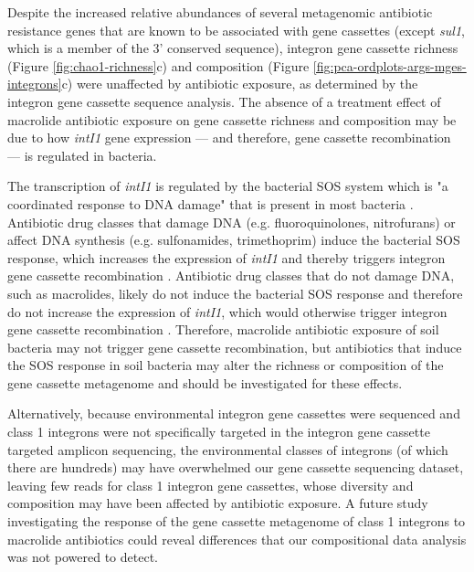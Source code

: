 Despite the increased relative abundances of several metagenomic antibiotic resistance genes that are known to be associated with gene cassettes (except \textit{sul1}, which is a member of the 3' conserved sequence), integron gene cassette richness (Figure \ref{fig:chao1-richness}c) and composition (Figure \ref{fig:pca-ordplots-args-mges-integrons}c) were unaffected by antibiotic exposure, as determined by the integron gene cassette sequence analysis.
The absence of a treatment effect of macrolide antibiotic exposure on gene cassette richness and composition may be due to how \textit{intI1} gene expression --- and therefore, gene cassette recombination --- is regulated in bacteria.

The transcription of \textit{intI1} is regulated by the bacterial SOS system which is "a coordinated response to DNA damage" that is present in most bacteria \parencite{Maslowska.2019}.
Antibiotic drug classes that damage DNA (e.g. fluoroquinolones, nitrofurans) or affect DNA synthesis (e.g. sulfonamides, trimethoprim) induce the bacterial SOS response, which increases the expression of \textit{intI1} and thereby triggers integron gene cassette recombination \parencite{Guerin.2009, Baharoglu.2010}.
Antibiotic drug classes that do not damage DNA, such as macrolides, likely do not induce the bacterial SOS response and therefore do not increase the expression of \textit{intI1}, which would otherwise trigger integron gene cassette recombination \parencite{Hastings.2004}.
Therefore, macrolide antibiotic exposure of soil bacteria may not trigger gene cassette recombination, but antibiotics that induce the SOS response in soil bacteria may alter the richness or composition of the gene cassette metagenome and should be investigated for these effects.

Alternatively, because environmental integron gene cassettes were sequenced and class 1 integrons were not specifically targeted in the integron gene cassette targeted amplicon sequencing, the environmental classes of integrons (of which there are hundreds) may have overwhelmed our gene cassette sequencing dataset, leaving few reads for class 1 integron gene cassettes, whose diversity and composition may have been affected by antibiotic exposure.
A future study investigating the response of the gene cassette metagenome of class 1 integrons to macrolide antibiotics could reveal differences that our compositional data analysis was not powered to detect.

